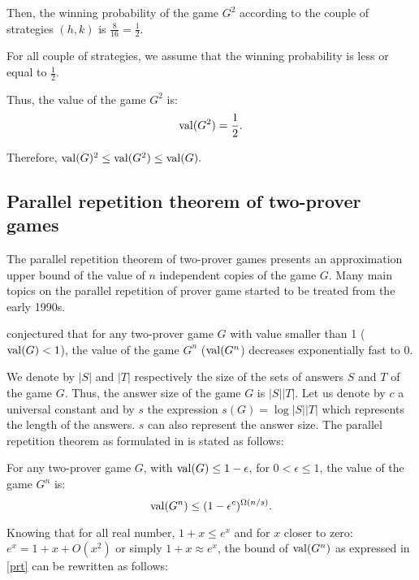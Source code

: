 Then, the winning probability of the game $G^2$ according to the couple of strategies $(h,k)$ is $\frac{8}{16}=\frac{1}{2}.$

For all couple of strategies, we assume that the winning probability is less or equal to $\frac{1}{2}.$

Thus, the value of the game $G^2$  is: $$\mathrm{val} (G^2)=\frac{1}{2}.$$

Therefore, $\mathrm{val} (G)^2\leq \mathrm{val} (G^2) \leq \mathrm{val} (G).$



\subsection{Parallel repetition theorem of two-prover games}

The parallel repetition theorem of  two-prover games presents an  approximation upper bound of the value of $n$ independent copies of the game $G$.
Many main topics on the parallel repetition of prover game started to be treated from the early 1990s. 

\cite{feige1992two} conjectured that  for any two-prover game $G$ with value smaller than 1 ($\mathrm{val} (G)<1$), the value of the game $G^n$ ($\mathrm{val} (G^n$) decreases exponentially fast to 0.

We denote by $|S|$ and $|T|$ respectively the size of the sets of answers $S$ and $T$ of the game $G$. Thus, the  answer  size of the game $G$ is $|S||T|$.
Let us denote by $c$ a universal constant and by $s$ the expression  $s(G)=\log |S||T|$ which represents the length of the answers. $s$ can also represent the  answer size.
The parallel repetition theorem as formulated in \cite{raz1998parallel,raz2010parallel} is stated as follows:

\begin{thm} For any two-prover game $G$, with $\mathrm{val} (G) \leq 1-\epsilon$, for $0 < \epsilon \leq 1$, the value of the game $G^n$ is: $$ \mathrm{val} (G^n) \leq (1-\epsilon^c)^{\Omega(n/s)}.$$ \label{prt}    \end{thm}

Knowing that for all real number, $1+x \leq e^x$ and
for $x$ closer to zero:  $e^x = 1+x+O(x^2)$ or simply  $1+x \approx e^x$,
the bound of $\mathrm{val} (G^n)$ as expressed in \eqref{prt} can be rewritten as follows:

